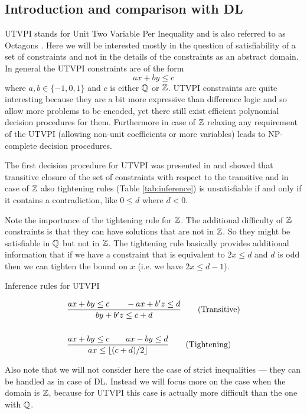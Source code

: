 \subsection{Introduction and comparison with DL}

UTVPI stands for Unit Two Variable Per Inequality and is also referred to as
Octagons \cite{bib:octagons}. Here we will be interested mostly in the question
of satisfiability of a set of constraints and not in the details of the
constraints as an abstract domain. In general the UTVPI constraints are of the
form
\[
a x + b y \leq c
\]
where $a, b \in \{ -1, 0, 1 \}$ and $c$ is either $\mathbb{Q}$ or $\mathbb{Z}$.
UTVPI constraints are quite interesting because they are a bit more expressive
than difference logic and so allow more problems to be encoded, yet there still
exist efficient polynomial decision procedures for them. Furthermore in case of
$\mathbb{Z}$ relaxing any requirement of the UTVPI (allowing non-unit
coefficients or more variables) leads to NP-complete decision procedures.

The first decision procedure for UTVPI was presented in \cite{bib:beyond_finite}
and showed that transitive closure of the set of constraints with respect to the
transitive and in case of $\mathbb{Z}$ also tightening rules (Table
\ref{tab:inference}) is unsatisfiable if and only if it contains a
contradiction, like $0 \leq d$ where $d < 0$.

Note the importance of the tightening rule for $\mathbb{Z}$. The additional
difficulty of $\mathbb{Z}$ constraints is that they can have solutions that are
not in $\mathbb{Z}$. So they might be satisfiable in $\mathbb{Q}$ but not in
$\mathbb{Z}$. The tightening rule basically provides additional information that
if we have a constraint that is equivalent to $2x \leq d$ and $d$ is odd then
we can tighten the bound on $x$ (i.e. we have $2x \leq d - 1$).

\begin{table}[b]
\caption{Inference rules for UTVPI}
\label{tab:inference}
\centering
\begin{align}
& \frac{ ax + by \leq c  \qquad  -ax + b'z \leq d }
     { by +b'z \leq c + d}
\tag{Transitive} \\
& \notag \\
& \frac{ ax + by \leq c  \qquad  ax - by \leq d }
     { ax \leq \lfloor (c + d) / 2 \rfloor }
\tag{Tightening}
\end{align}
\end{table}
%
Also note that we will not consider here the case of strict inequalities ---
they can be handled as in case of DL. Instead we will focus more on the case
when the domain is $\mathbb{Z}$, because for UTVPI this case is actually
more difficult than the one with $\mathbb{Q}$.

